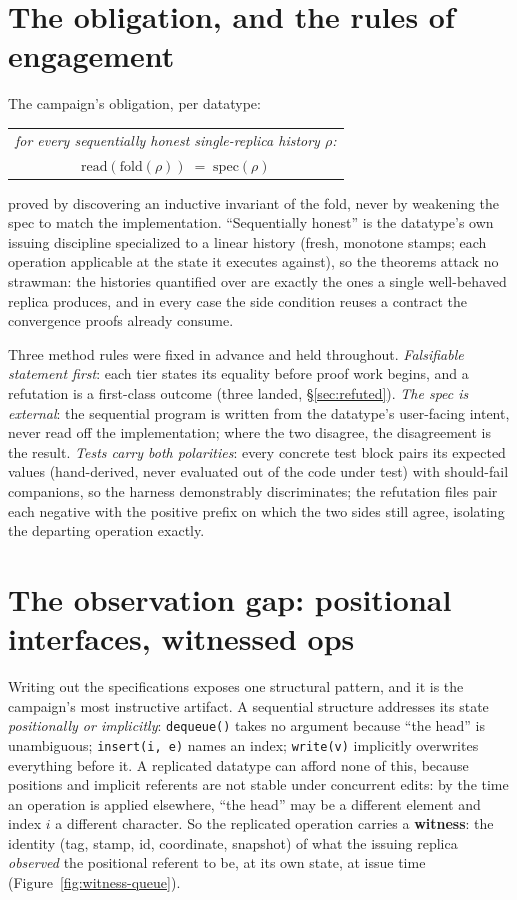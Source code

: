 \documentclass[11pt]{article}
\newcommand{\code}[1]{\texttt{#1}}
\begin{document}
\section{The obligation, and the rules of engagement}
\label{sec:obligation}

The campaign's obligation, per datatype:
\begin{center}
\begin{tabular}{c}
\emph{for every sequentially honest single-replica history $\rho$:}\\[3pt]
$\mathrm{read}(\mathrm{fold}(\rho)) \;=\; \mathrm{spec}(\rho)$
\end{tabular}
\end{center}
proved by discovering an inductive invariant of the fold, never by
weakening the spec to match the implementation. ``Sequentially
honest'' is the datatype's own issuing discipline specialized to a
linear history (fresh, monotone stamps; each operation applicable at
the state it executes against), so the theorems attack no strawman:
the histories quantified over are exactly the ones a single
well-behaved replica produces, and in every case the side condition
reuses a contract the convergence proofs already consume.

Three method rules were fixed in advance and held throughout.
\emph{Falsifiable statement first}: each tier states its equality
before proof work begins, and a refutation is a first-class outcome
(three landed, \S\ref{sec:refuted}). \emph{The spec is external}: the
sequential program is written from the datatype's user-facing intent,
never read off the implementation; where the two disagree, the
disagreement is the result. \emph{Tests carry both polarities}: every
concrete test block pairs its expected values (hand-derived, never
evaluated out of the code under test) with should-fail companions, so
the harness demonstrably discriminates; the refutation files pair each
negative with the positive prefix on which the two sides still agree,
isolating the departing operation exactly.

\section{The observation gap: positional interfaces, witnessed ops}
\label{sec:witness}

Writing out the specifications exposes one structural pattern, and it
is the campaign's most instructive artifact. A sequential structure
addresses its state \emph{positionally or implicitly}:
\code{dequeue()} takes no argument because ``the head'' is
unambiguous; \code{insert(i, e)} names an index; \code{write(v)}
implicitly overwrites everything before it. A replicated datatype can
afford none of this, because positions and implicit referents are not
stable under concurrent edits: by the time an operation is applied
elsewhere, ``the head'' may be a different element and index $i$ a
different character. So the replicated operation carries a
\textbf{witness}: the identity (tag, stamp, id, coordinate, snapshot)
of what the issuing replica \emph{observed} the positional referent to
be, at its own state, at issue time (Figure~\ref{fig:witness-queue}).
\end{document}
